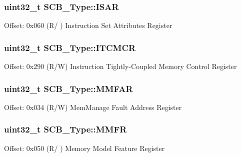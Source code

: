 \subsubsection[{\texorpdfstring{I\+S\+AR}{ISAR}}]{ uint32\+\_\+t S\+C\+B\+\_\+\+Type\+::\+I\+S\+AR}\hypertarget{struct_s_c_b___type_a84715ecbe885efa4841d594e7409ccae}{}\label{struct_s_c_b___type_a84715ecbe885efa4841d594e7409ccae}
Offset\+: 0x060 (R/ ) Instruction Set Attributes Register 
\subsubsection[{\texorpdfstring{I\+T\+C\+M\+CR}{ITCMCR}}]{ uint32\+\_\+t S\+C\+B\+\_\+\+Type\+::\+I\+T\+C\+M\+CR}\hypertarget{struct_s_c_b___type_a6f52bb11b40cad59e836366a43686d63}{}\label{struct_s_c_b___type_a6f52bb11b40cad59e836366a43686d63}
Offset\+: 0x290 (R/W) Instruction Tightly-\/\+Coupled Memory Control Register 
\subsubsection[{\texorpdfstring{M\+M\+F\+AR}{MMFAR}}]{ uint32\+\_\+t S\+C\+B\+\_\+\+Type\+::\+M\+M\+F\+AR}\hypertarget{struct_s_c_b___type_ac49b24b3f222508464f111772f2c44dd}{}\label{struct_s_c_b___type_ac49b24b3f222508464f111772f2c44dd}
Offset\+: 0x034 (R/W) Mem\+Manage Fault Address Register 
\subsubsection[{\texorpdfstring{M\+M\+FR}{MMFR}}]{ uint32\+\_\+t S\+C\+B\+\_\+\+Type\+::\+M\+M\+FR}\hypertarget{struct_s_c_b___type_a40b4fec8c296cba02baec983378cbcfd}{}\label{struct_s_c_b___type_a40b4fec8c296cba02baec983378cbcfd}
Offset\+: 0x050 (R/ ) Memory Model Feature Register 
